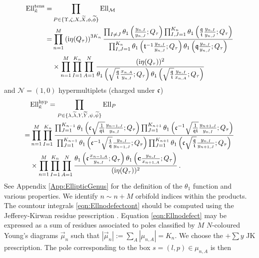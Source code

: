 \documentclass[main.tex]{subfiles}
\begin{document}
\begin{equation}
\begin{aligned}
\textrm{Ell}^{\text{tens}}_{\tilde{\kappa}}=&\prod_{P\in\{\Upsilon,\zeta,X,\widetilde{X},\phi,\widetilde{\phi}\}}\textrm{Ell}_{\mathcal{M}}\\
=&\prod_{n=1}^{M}\left(\mathrm{i}\eta(Q_{\tau})\right)^{3K_n}\frac{\prod_{I\neq J}\theta_1\left(\frac{y_{n,I}}{y_{n,J}};Q_{\tau}\right)\prod_{I,J=1}^{K_n}\theta_1\left(\frac{\mathfrak{q}}{\mathfrak{t}}\frac{y_{n,I}}{y_{n,J}};Q_{\tau}\right)}{\prod_{I,J=1}^{K_n}\theta_1\left(\mathfrak{t}^{-1}\frac{y_{n,I}}{y_{n,J}};Q_{\tau}\right)\theta_1\left(\mathfrak{q}\frac{y_{n,I}}{y_{n,J}};Q_{\tau}\right)}\\
&\times\prod_{n=1}^M\prod_{I=1}^{K_n}\prod_{A=1}^N\frac{(\mathrm{i}\eta(Q_{\tau}))^2}{\theta_1\left(\sqrt{\frac{\mathfrak{q}}{\mathfrak{t}}}\frac{x_{n,A}}{y_{n,I}};Q_{\tau}\right)\theta_1\left(\sqrt{\frac{\mathfrak{q}}{\mathfrak{t}}}\frac{y_{n,I}}{x_{n,A}};Q_{\tau}\right)}
\end{aligned}
\end{equation}
and $\mathcal{N}=(1,0)$ hypermultiplets (charged under $\mathfrak{c}$)
\begin{equation}
\begin{aligned}
&\textrm{Ell}^{\text{hyp}}_{\tilde{\kappa}}=\prod_{P\in\{\lambda,\widetilde{\lambda},Y,\widetilde{Y},\psi,\widetilde{\psi}\}}\textrm{Ell}_{P}\\
=&\prod_{n=1}^{M}\prod_{I=1}^{K_n}\frac{\prod_{J=1}^{K_{n-1}}\theta_1\left(\mathfrak{c}\sqrt{\frac{1}{\mathfrak{q}\mathfrak{t}}}\frac{y_{n-1,J}}{y_{n,I}};Q_{\tau}\right)\prod_{J=1}^{K_{n+1}}\theta_1\left(\mathfrak{c}^{-1}\sqrt{\frac{1}{\mathfrak{q}\mathfrak{t}}}\frac{y_{n+1,J}}{y_{n,I}};Q_{\tau}\right)}{\prod_{J=1}^{K_{n-1}}\theta_1\left(\mathfrak{c}^{-1}\sqrt{\frac{\mathfrak{t}}{\mathfrak{q}}}\frac{y_{n,I}}{y_{n-1,J}};Q_{\tau}\right)\prod_{J=1}^{K_{n+1}}\theta_1\left(\mathfrak{c}\sqrt{\frac{\mathfrak{q}}{\mathfrak{t}}}\frac{y_{n,I}}{y_{n+1,J}};Q_{\tau}\right)}\\
&\times\prod_{n=1}^{M}\prod_{I=1}^{K_n}\prod_{A=1}^N\frac{\theta_1\left(\mathfrak{c}\frac{x_{n-1,A}}{y_{n,I}};Q_{\tau}\right)\theta_1\left(\mathbf{c}\frac{y_{n,I}}{x_{n+1,A}};Q_{\tau}\right)}{(\mathrm{i}\eta(Q_{\tau}))^2}\,.
\end{aligned}
\end{equation}
See Appendix \ref{App:EllipticGenus} for the definition of the $\theta_1$ function and various properties. We identify $n\sim n+M$ orbifold indices within the products. The countour integrals \eqref{eqn:Ellnodefectcont} should be computed using the Jefferey-Kirwan residue prescription \cite{1993alg.geom..7001J,Benini:2013nda,Benini:2013xpa}. 
Equation \eqref{eqn:Ellnodefect} may be expressed as a sum of residues associated to poles classified by $M$ $N$-coloured Young's diagrams $\vec{\mu}_n$ such that $|\vec{\mu}_n|:=\sum_{A}|\mu_{n,A}|=K_n$. We choose the $+\sum y$ JK prescription. The pole corresponding to the box $s=(l,p)\in\mu_{n,A}$ is then
\end{document}
